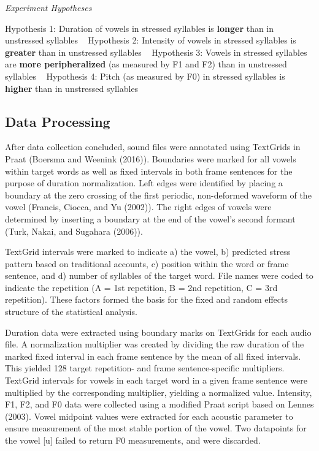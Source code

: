 \documentclass[english,man]{apa6}
\theoremstyle{definition}
\theoremstyle{definition}
\theoremstyle{definition}
\theoremstyle{remark}
\begin{document}
\begin{exe}
\ex \textit{Experiment Hypotheses}\
\begin{xlist}
\ex\label{ex1a} Hypothesis 1: Duration of vowels in stressed syllables is \textbf{longer} than in unstressed syllables \
\ex\label{ex1b} Hypothesis 2: Intensity of vowels in stressed syllables is \textbf{greater} than in unstressed syllables \
\ex\label{ex1c} Hypothesis 3: Vowels in stressed syllables are \textbf{more peripheralized} (as measured by F1 and F2) than in unstressed syllables \
\ex\label{1d} Hypothesis 4: Pitch (as measured by F0) in stressed syllables is \textbf{higher} than in unstressed syllables
\end{xlist}
\end{exe}

\subsection{Data Processing}\label{data-processing}

After data collection concluded, sound files were annotated using
TextGrids in Praat (Boersma and Weenink (2016)). Boundaries were marked
for all vowels within target words as well as fixed intervals in both
frame sentences for the purpose of duration normalization. Left edges
were identified by placing a boundary at the zero crossing of the first
periodic, non-deformed waveform of the vowel (Francis, Ciocca, and Yu
(2002)). The right edges of vowels were determined by inserting a
boundary at the end of the vowel's second formant (Turk, Nakai, and
Sugahara (2006)).

TextGrid intervals were marked to indicate a) the vowel, b) predicted
stress pattern based on traditional accounts, c) position within the
word or frame sentence, and d) number of syllables of the target word.
File names were coded to indicate the repetition (A = 1st repetition, B
= 2nd repetition, C = 3rd repetition). These factors formed the basis
for the fixed and random effects structure of the statistical analysis.

Duration data were extracted using boundary marks on TextGrids for each
audio file. A normalization multiplier was created by dividing the raw
duration of the marked fixed interval in each frame sentence by the mean
of all fixed intervals. This yielded 128 target repetition- and frame
sentence-specific multipliers. TextGrid intervals for vowels in each
target word in a given frame sentence were multiplied by the
corresponding multiplier, yielding a normalized value. Intensity, F1,
F2, and F0 data were collected using a modified Praat script based on
Lennes (2003). Vowel midpoint values were extracted for each acoustic
parameter to ensure measurement of the most stable portion of the vowel.
Two datapoints for the vowel {[}u{]} failed to return F0 measurements,
and were discarded.
\end{document}
